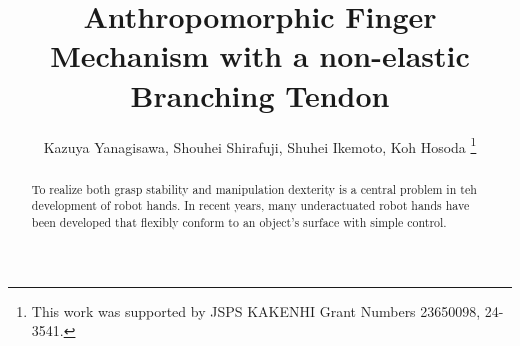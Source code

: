 \documentclass{llncs}
\begin{document}
\title{Anthropomorphic Finger Mechanism with a non-elastic Branching Tendon}
\author{Kazuya Yanagisawa, Shouhei Shirafuji, Shuhei Ikemoto, Koh Hosoda
\thanks{This work was supported by JSPS KAKENHI Grant Numbers 23650098, 24-3541.}}
\maketitle

\begin{abstract}
	To realize both grasp
	stability and manipulation dexterity is a central
	problem in teh development of robot hands.
	In recent years, many underactuated robot hands have been developed that
	flexibly conform to an object's surface with %
	simple control.
	

\end{abstract}
\end{document}
